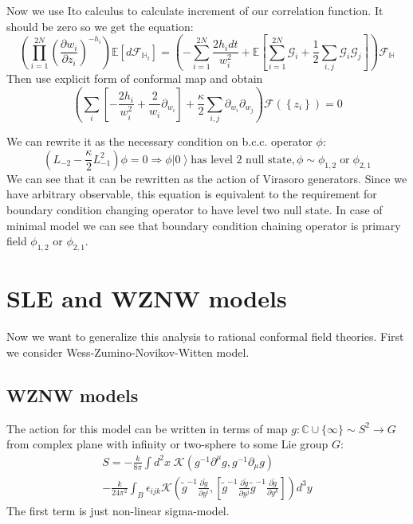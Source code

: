 Now we use Ito calculus to calculate increment of our correlation function. It should be zero so we get the equation:
\begin{equation}
  \left(\prod_{i=1}^{2N}\left(\frac{\partial w_{i}}{\partial z_{i}}\right)^{-h_{i}}\right)\mathbb{E}\left[d 
    \mathcal{F}_{\mathbb{H}_{t}}\right]=\left(-\sum_{i=1}^{2N}\frac{2h_{i}dt}{w_{i}^{2}}+\mathbb{E}\left[\sum_{i=1}^{2N}\mathcal{G}_{i}+\frac{1}{2}
      \sum_{i,j}\mathcal{G}_{i}\mathcal{G}_{j}\right]\right)\mathcal{F}_{\mathbb{H}}
\label{eq:8}
\end{equation}
Then use explicit form of conformal map and obtain
\begin{equation*}
  \left( \sum_{i}\left[-\frac{2h_{i}}{w_{i}^{2}} +\frac{2}{w_{i}}\partial_{w_{i}}\right]+\frac{\kappa}{2}\sum_{i,j}\partial_{w_{i}} \partial_{w_{j}}\right)\mathcal{F}(\left\{z_{i}\right\})=0
\end{equation*}

We can rewrite it as the necessary condition on b.c.c. operator $\phi$:
\begin{equation*}
  (L_{-2}-\frac{\kappa}{2}L_{-1}^{2})\phi=0 \Longrightarrow \phi \left|0\right>  \text{has level 2 null state}, \phi\sim \phi_{1,2} \;\text{or}\; \phi_{2,1}
\end{equation*}
We can see that it can be rewritten as the action of Virasoro generators. Since we have arbitrary observable, this equation is equivalent to the requirement for boundary condition changing operator to have level two null state. 
In case of minimal model we can see that boundary condition chaining operator is primary field $\phi_{1,2}$ or $\phi_{2,1}$.

\section{SLE and WZNW models}
\label{sec:sle-wzw-models}
Now we want to generalize this analysis to rational conformal field theories. First we consider Wess-Zumino-Novikov-Witten model.
\subsection{WZNW models}

 The action for this model can be written in terms of map $g:\mathbb{C}\cup \{\infty\}\sim S^{2}\to G$ from complex plane with infinity or two-sphere to some Lie group $G$:
\begin{multline}
  S=-\frac{k}{8\pi}\int d^2x\; \mathcal{K} (g^{-1}\partial^{\mu}g, g^{-1} \partial_{\mu}g)  
  \\
  - \frac{k }{24\pi^{2}} \int_{B}\epsilon_{ijk} \mathcal{K}\left(
    \tilde g^{-1}\frac{\partial \tilde g}{\partial y^i},\left[
      \tilde g^{-1}\frac{\partial \tilde g}{\partial y^j}
      \tilde g^{-1}\frac{\partial \tilde g}{\partial y^k}\right]\right) d^3y
\end{multline}
The first term is just non-linear sigma-model.


